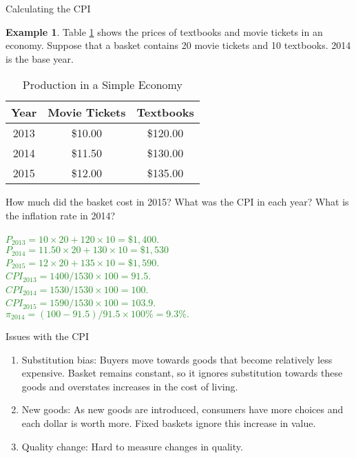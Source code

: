 \documentclass[xcolor={dvipsnames},pdf, hyperref={colorlinks=true, citecolor=ForestGreen, linkcolor=BlueViolet, urlcolor=Magenta}]{beamer}
\theoremstyle{definition}
\newtheorem{exmp}{Example}[section]
\newcommand{\ddp}[1]{{\textcolor{ForestGreen}{#1}}}
\begin{document}
\begin{frame}{Calculating the CPI}

\tiny
\begin{exmp} Table \ref{cpi} shows the prices of textbooks and movie tickets in an economy. Suppose that a basket contains 20 movie tickets and 10 textbooks. 2014 is the base year.
	
	\begin{table}[ht]
		\centering
		\caption{Production in a Simple Economy}
		\label{cpi}
		\begin{tabular}{ c|c|c}       
			
			Year & Movie Tickets & Textbooks  \\
			\hline
			2013 & \$10.00 & \$120.00 \\
			2014 & \$11.50 & \$130.00 \\
			2015 & \$12.00 & \$135.00 \\
		\end{tabular}
	\end{table} 
	How much did the basket cost in 2015? What was the CPI in each year? What is the inflation rate in 2014?
\end{exmp}
\scriptsize
\ddp{\pause $P_{2013} = 10 \times 20 + 120 \times 10 = \$1,400$. \\ $P_{2014} = 11.50 \times 20 + 130 \times 10 = \$1,530$ \\
	$P_{2015} = 12 \times 20 + 135 \times 10 = \$1,590$. \\
\pause	$CPI_{2013} = 1400/1530 \times 100 = 91.5$. \\ $CPI_{2014} = 1530/1530 \times 100 = 100$. \\ $CPI_{2015} = 1590/1530 \times 100 = 103.9$. \\
\pause $\pi_{2014} = (100-91.5)/91.5\times 100\% = 9.3\%.$}
\end{frame}


\begin{frame}{Issues with the CPI}
\begin{enumerate}
	\item Substitution bias: Buyers move towards goods that become relatively less expensive. Basket remains constant, so it ignores substitution towards these goods and overstates increases in the cost of living.
	\item New goods: As new goods are introduced, consumers have more choices and each dollar is worth more. Fixed baskets ignore this increase in value.
	\item Quality change: Hard to measure changes in quality.
\end{enumerate}
\end{frame}
\end{document}
